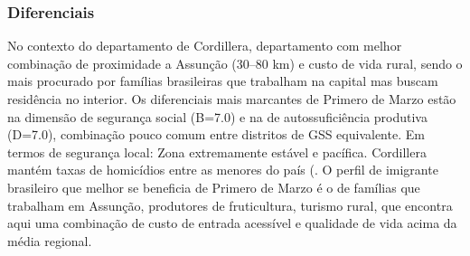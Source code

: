 \subsubsection*{Diferenciais}\label{dif-primero-de-marzo-0315}
No contexto do departamento de Cordillera, departamento com melhor combinação de proximidade a Assunção (30–80 km) e custo de vida rural, sendo o mais procurado por famílias brasileiras que trabalham na capital mas buscam residência no interior. Os diferenciais mais marcantes de Primero de Marzo estão na dimensão de segurança social (B=7.0) e na de autossuficiência produtiva (D=7.0), combinação pouco comum entre distritos de GSS equivalente. Em termos de segurança local: Zona extremamente estável e pacífica. Cordillera mantém taxas de homicídios entre as menores do país (. O perfil de imigrante brasileiro que melhor se beneficia de Primero de Marzo é o de famílias que trabalham em Assunção, produtores de fruticultura, turismo rural, que encontra aqui uma combinação de custo de entrada acessível e qualidade de vida acima da média regional.
